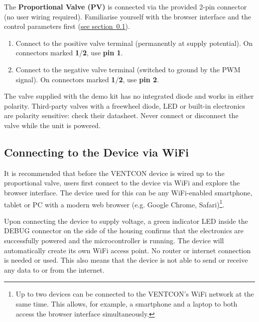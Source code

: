 \documentclass[
    11pt,
    a4paper,
    parskip=half-,          %
    headings=normal,        %
    captions=tableheading,  %
    numbers=noenddot        %
]{scrartcl}
\begin{document}
The \textbf{Proportional Valve (PV)} is connected via the provided 2-pin connector (no user wiring required).
Familiarise yourself with the browser interface and the control parameters first (\underline{see section~\ref{sec:connWifi}}).

\begin{tcolorbox}[blanker, borderline west={1pt}{0pt}{ventrexblue}, left=1em]
    \begin{enumerate}[leftmargin=6em]
            \item [Pos. \textbf{7)}] Connect to the positive valve terminal (permanently at supply
            potential). On connectors marked \textbf{1}/\textbf{2}, use \textbf{pin 1}.
            \item [Pos. \textbf{8)}] Connect to the negative valve terminal (switched to ground by
            the PWM signal). On connectors marked \textbf{1}/\textbf{2}, use \textbf{pin 2}.
    \end{enumerate}

    \begin{tcolorbox}[
        colback=ventrexblue!8,
        colframe=ventrexblue,
        fonttitle=\bfseries,
        title=Important,
        boxrule=0.6pt,
        arc=2pt
    ]
    The valve supplied with the demo kit has no integrated diode and works in either polarity. Third-party valves
    with a freewheel diode, LED or built-in electronics are polarity sensitive: check their datasheet. Never
    connect or disconnect the valve while the unit is powered.
    \end{tcolorbox}
\end{tcolorbox}




\subsection{Connecting to the Device via WiFi}\label{sec:connWifi}

It is recommended that before the VENTCON device is wired up to the proportional valve, users first connect to the device via WiFi and explore 
the browser interface. The device used for this can be any WiFi-enabled smartphone, tablet or PC with a modern web browser (e.g. Google Chrome, Safari)\footnote{Up to two devices can be connected to the VENTCON's WiFi network at the same time.
This allows, for example, a smartphone and a laptop to both access the browser interface simultaneously.}. 

Upon connecting the device to supply voltage, a green indicator LED inside the DEBUG connector on the side of the housing confirms 
that the electronics are successfully powered and the microcontroller is running.
The device will automatically create its own WiFi access point. No router or internet connection is needed or used.
This also means that the device is not able to send or receive any data to or from the internet.
\end{document}
